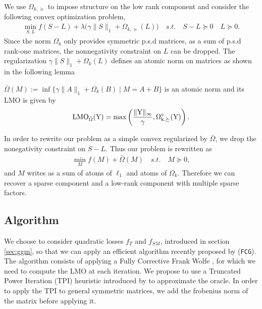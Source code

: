 We use $\Omega_{k,\succeq}$ to impose structure on the low rank component and consider the following convex optimization problem,
\begin{align}
\label{opt}
\min_{S,L} f(S-L)+\lambda\big(\gamma\|S\|_{1}+\Omega_{k,\succeq}(L)\big) \quad s.t. \quad S-L \succeq 0 \quad L \succeq 0.
\end{align}
Since the norm $\Omega_k$ only provides symmetric p.s.d matrices, as a sum of p.s.d rank-one matrices, the nonnegativity constraint on $L$ can be dropped. The regularization $\gamma\|S\|_{1}+\Omega_k(L)$ defines an atomic norm on matrices as shown in the following lemma
\begin{lemm} $\bar{\Omega}(M):=\inf\{\gamma\|A\|_{1}+\Omega_k(B)\mid M=A+B\}$ is an atomic norm and its \rm{LMO} is given by 
\begin{align*}
\rm{LMO}_{\bar{\Omega}}(Y)=\max\left(\frac{\|Y\|_{\infty}}{\gamma},\Omega_{k,\succeq}^{\circ}(Y)\right).
\end{align*}
\end{lemm}
In order to rewrite our problem as a simple convex regularized by $\bar{\Omega}$, we drop the nonegativity constraint on $S-L$. Thus our problem is rewritten as
\begin{align}
\label{opt_at}
\min_{M} f(M)+ \bar{\Omega}(M) \quad s.t. \quad M \succeq 0,
\end{align}
and $M$ writes as a sum of atoms of $\ell_1$ and atoms of $\Omega_k$. Therefore we can recover a sparse component and a low-rank component with multiple sparse factors.\\

\subsection{Algorithm}
We choose to consider quadratic losses $f_{T}$ and $f_{SM}$, introduced in section \ref{sec:ggm}, so that we can apply an efficient algorithm recently proposed by \citet{vinyes2017}(\texttt{FCG}). The algorithm consists of applying a Fully Corrective Frank Wolfe \citep{LacosteFCFW}, for which we need to compute the LMO at each iteration. 
We propose to use a Truncated Power Iteration (TPI) heuristic introduced by \citet{yuan2013truncated} to approximate the oracle. In order to apply the TPI to general symmetric matrices, we add the frobenius norm of the matrix before applying it. \\


